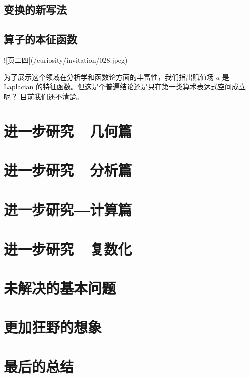\documentclass[a4paper,12pt]{book}
\numberwithin{problem}{section}
\numberwithin{definition}{section}
\numberwithin{lemma}{section}
\numberwithin{proposition}{section}
\numberwithin{theorem}{section}
\numberwithin{grammar}{section}
\numberwithin{program}{section}
\numberwithin{convention}{section}
\numberwithin{corollary}{section}
\begin{document}
\section{变换的新写法}

\section{算子的本征函数}

![页二四](/curiosity/invitation/028.jpeg)

为了展示这个领域在分析学和函数论方面的丰富性，我们指出赋值场 $a$ 是 Laplacian 的特征函数。但这是个普遍结论还是只在第一类算术表达式空间成立呢？
目前我们还不清楚。

\newpage

\chapter{进一步研究—几何篇}

\newpage

\chapter{进一步研究—分析篇}

\newpage

\chapter{进一步研究—计算篇}

\newpage

\chapter{进一步研究—复数化}

\newpage

\chapter{未解决的基本问题}

\newpage

\chapter{更加狂野的想象}

\newpage

\chapter{最后的总结}
\end{document}
